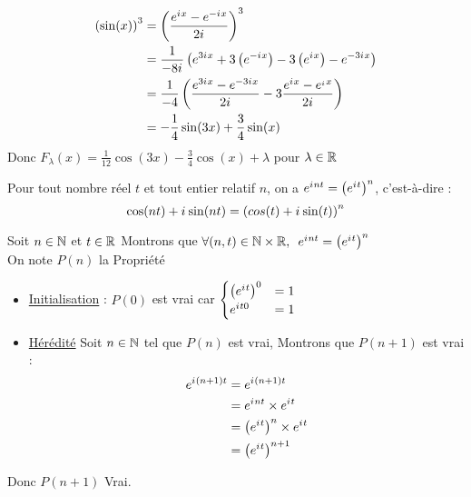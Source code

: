\begin{corr}
	\begin{align*}
		\left(\sin(x)\right)^3 & = \left(\frac{e^{i\mkern1mu x}-e^{-i\mkern1mu x}}{2 i\mkern1mu}\right)^3                                              \\
		                  & =\frac{1}{-8i\mkern1mu} \left(e^{3i\mkern1mu x}+3\left(e^{-i\mkern1mu x}\right)-3\left(e^{i\mkern1mu x}\right) -e^{-3 i\mkern1mu x}\right)      \\
		                  & =\frac{1}{-4} \left(\frac{e^{3i\mkern1mu x}-e^{-3i\mkern1mu x}}{2 i\mkern1mu}-3\frac{e^{i\mkern1mu x}-e^{_i\mkern1mu x}}{2 i\mkern1mu}\right) \\
		                  & = -\frac{1}{4}\sin(3x) +\frac{3}{4}\sin(x)
	\end{align*}
	Donc \(F_\lambda(x) = \frac{1}{12}\cos(3x)- \frac{3}{4}\cos(x) + \lambda \) pour \(\lambda \in \mathbb{R} \)
\end{corr}

\begin{defprop}
	Pour tout nombre réel \(t\) et tout entier relatif \(n\), on a \(e^{i\mkern1mu nt} = \left(e^{i\mkern1mu t}\right)^n\), c’est-à-dire :
	\[\cos(nt)+i\mkern1mu\sin(nt) = \left(cos(t)+i\mkern1mu \sin(t)\right)^n\]
\end{defprop}

\begin{dem}
	Soit \(n \in \mathbb{N}\) et \(t\in\mathbb{R}\)
	Montrons que \(\quantifs{\forall (n,t) \in \N\times\R} e^{\i nt} = \paren{e^{\i t}}^n\) \\
	On note \(P(n)\) la Propriété 
	\begin{itemize}
		\item \underline{Initialisation} :
		      \(P(0)\) est vrai car \(\begin{cases}
			      \left(e^{i\mkern1mu t}\right)^0 & = 1 \\
			      e^{i\mkern1mu t 0}         & = 1
		      \end{cases}\)
		\item \underline{Hérédité}
		      Soit \(n \in \mathbb{N}\) tel que \(P(n)\) est vrai, Montrons que \(P(n+1)\) est vrai :
		      \begin{align*}
			      e^{i\mkern1mu (n+1) t} & = e^{i\mkern1mu(n+1)t}                      \\
			                     & = e^{i\mkern1mu n t} \times e^{i\mkern1mu t}        \\
			                     & =\left(e^{i\mkern1mu t}\right)^n \times e^{i\mkern1mu t} \\
			                     & = \left(e^{i\mkern1mu t}\right)^{n+1}            \\
		      \end{align*}
	\end{itemize}
	Donc \(P(n+1)\) Vrai.
\end{dem}

